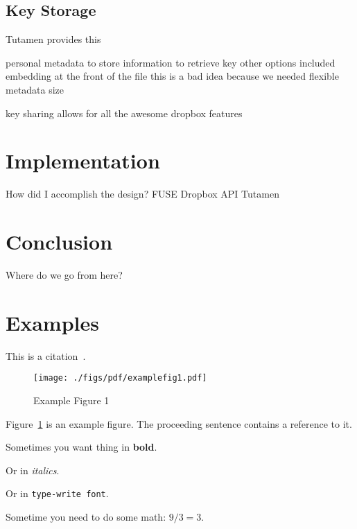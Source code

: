 \documentclass[11pt,twocolumn,letterpaper]{article}
\newcommand{\custos}{Tutamen }
\begin{document}
\subsection{Key Storage}
\label{sec:keystorage}
\custos provides this

personal metadata to store information to retrieve key
  other options included embedding at the front of the file
   this is a bad idea because we needed flexible metadata size

key sharing allows for all the awesome dropbox features 

\section{Implementation}
\label{sec:implementation}

How did I accomplish the design?
FUSE
Dropbox API
\custos

\section{Conclusion}
\label{sec:conclusion}

Where do we go from here?

\section{Examples}
\label{sec:ex}

\noindent
This is a citation~\cite{exampleref1}.



\begin{figure}[htb]
  \centering
  \texttt{[image: ./figs/pdf/examplefig1.pdf]}
  \caption{Example Figure 1}
  \label{fig:example1}
\end{figure}

\noindent
Figure~\ref{fig:example1} is an example figure. The proceeding
sentence contains a reference to it.

\noindent
Sometimes you want thing in {\bf bold}.

\noindent
Or in {\em italics}.

\noindent
Or in \texttt{type-write font}.

\noindent
Sometime you need to do some math: $9/3=3$.
\end{document}
